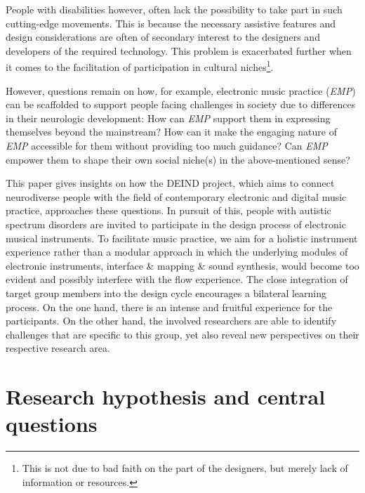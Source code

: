 \documentclass{chi-ext}
\begin{document}
\begin{multicols}{2}

People with disabilities however, often lack the possibility to take part in such cutting-edge movements. This is because the necessary assistive features and design considerations are often of secondary interest to the designers and developers of the required technology. This problem is exacerbated further when it comes to the facilitation of participation in cultural niches\footnote{This is not due to bad faith on the part of the designers, but merely lack of information or resources.}.

However, questions remain on how, for example, electronic music practice (\emph{EMP}) can be scaffolded to support people facing challenges in society due to differences in their neurologic development:
How can \emph{EMP} support them in expressing themselves beyond the mainstream? 
How can it make the engaging nature of \emph{EMP} accessible for them without providing too much guidance?
Can \emph{EMP} empower them to shape their own social niche(s) in the above-mentioned sense?

This paper gives insights on how the DEIND project, which aims to connect neurodiverse people with the field of contemporary electronic and digital music practice, approaches these questions.
In pursuit of this, people with autistic spectrum disorders are invited to participate in the design process of electronic musical instruments. 
To facilitate music practice, we aim for a holistic instrument experience rather than a modular approach in which the underlying modules of electronic instruments, interface \& mapping \& sound synthesis, would become too evident and possibly interfere with the flow experience. 
The close integration of target group members into the design cycle encourages a bilateral learning process. 
On the one hand, there is an intense and fruitful experience for the participants. On the other hand, the involved researchers are able to identify challenges that are specific to this group, yet also reveal new perspectives on their respective research area.

\section{Research hypothesis and central questions}
\label{sec:research_objectives}


\end{multicols}
\end{document}
